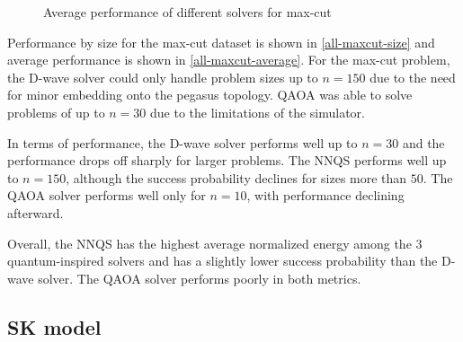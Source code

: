 \begin{figure}[!htbp]
    \centering
    \hfill
    \caption{Average performance of different solvers for max-cut}
    \label{all-maxcut-average}
\end{figure}

Performance by size for the max-cut dataset is shown in \autoref{all-maxcut-size} and average performance is shown in \autoref{all-maxcut-average}. For the max-cut problem, the D-wave solver could only handle problem sizes up to $n=150$ due to the need for minor embedding onto the pegasus topology. QAOA was able to solve problems of up to $n=30$ due to the limitations of the simulator.

In terms of performance, the D-wave solver performs well up to $n=30$ and the performance drops off sharply for larger problems. The NNQS performs well up to $n=150$, although the success probability declines for sizes more than $50$. The QAOA solver performs well only for $n=10$, with performance declining afterward.

Overall, the NNQS has the highest average normalized energy among the 3 quantum-inspired solvers and has a slightly lower success probability than the D-wave solver. The QAOA solver performs poorly in both metrics.

\subsection{SK model}


